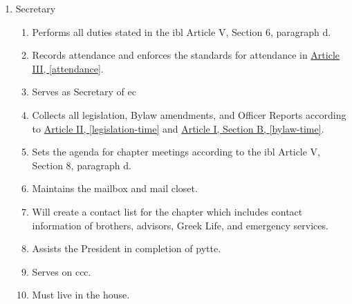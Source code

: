 \begin{enumerate}
		\item Secretary
			\begin{enumerate}
				\item Performs all duties stated in the \gls{ibl} Article V, Section 6, paragraph d.
				\item Records attendance and enforces the standards for attendance in \hyperref[attendance]{Article III, \autoref*{attendance}}.
				\item Serves as Secretary of \gls{ec}
				\item Collects all legislation, Bylaw amendments, and Officer Reports according to \hyperref[legislation-time]{Article II, \autoref*{legislation-time}} and \hyperref[bylaw-time]{Article I, Section B, \autoref*{bylaw-time}}.
				\item Sets the agenda for chapter meetings according to the \gls{ibl} Article V, Section 8, paragraph d.
				\item Maintains the mailbox and mail closet.
				\item Will create a contact list for the chapter which includes contact information of brothers, advisors, Greek Life, and emergency services.
				\item Assists the President in completion of \gls{pytte}.
				\item Serves on \gls{ccc}.
				\item Must live in the house.
			\end{enumerate}


\end{enumerate}
